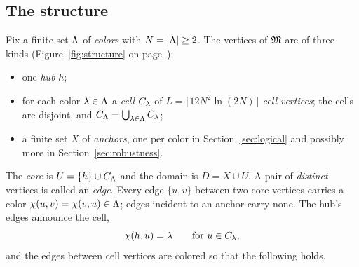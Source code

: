 \subsection{The structure}\label{sec:structure}
Fix a finite set $\Lambda$ of \emph{colors} with $N=|\Lambda|\ge2$. The vertices
of $\mathfrak M$ are of three kinds (Figure~\ref{fig:structure} on
page~\pageref{fig:structure}):
\begin{itemize}[nosep]
\item one \emph{hub} $h$;
\item for each color $\lambda\in\Lambda$ a \emph{cell} $C_{\lambda}$ of
 $L=\lceil12N^2\ln(2N)\rceil$ \emph{cell vertices}; the cells are disjoint,
 and $C_{\Lambda}=\bigcup_{\lambda\in\Lambda}C_{\lambda}$;
\item a finite set $X$ of \emph{anchors}, one per color in
 Section~\ref{sec:logical} and possibly more in
 Section~\ref{sec:robustness}.
\end{itemize}
The \emph{core} is $U=\{h\}\cup C_{\Lambda}$ and the domain is $D=X\cup U$. A
pair of \emph{distinct} vertices is called an \emph{edge}. Every edge
$\{u,v\}$ between two core vertices carries a color
$\chi(u,v)=\chi(v,u)\in\Lambda$; edges incident to an anchor carry none. The
hub's edges announce the cell,
\begin{equation}\label{eq:hub-colours}
 \chi(h,u)=\lambda\qquad\text{for }u\in C_{\lambda},
\end{equation}
and the edges between cell vertices are colored so that the following holds.

